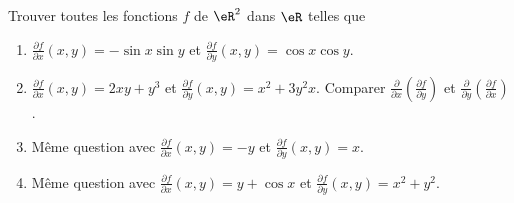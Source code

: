 \begin{exercice}\label{exoCalculDifferentiel0008}

	Trouver toutes les fonctions $f$ de $\eR^2$ dans $\eR$ telles que
	\begin{enumerate}
		\item\minsyndical
	$\frac{\partial f}{\partial x}(x,y) = -\sin x \sin y$
	et
	$\frac{\partial f}{\partial y}(x,y) = \cos x \cos y$.

	\item\boringexo
	$\frac{\partial f}{\partial x}(x,y) = 2xy +y^3$
	et
	$\frac{\partial f}{\partial y}(x,y) = x^2 + 3y^2 x$.
	Comparer $\frac{\partial }{\partial x} \left(\frac{\partial f}{\partial y} \right)$
	et   $\frac{\partial }{\partial y} \left(\frac{\partial f}{\partial x} \right)$.

	\item\minsyndical
	Même question avec 
	$\frac{\partial f}{\partial x}(x,y) = -y$
	et
	$\frac{\partial f}{\partial y}(x,y) = x$.

	\item\boringexo
	Même question avec 
	$\frac{\partial f}{\partial x}(x,y) =  y + \cos x $
	et
	$\frac{\partial f}{\partial y}(x,y) = x^2 + y^2 $.
			
	\end{enumerate}
 
\end{exercice}
